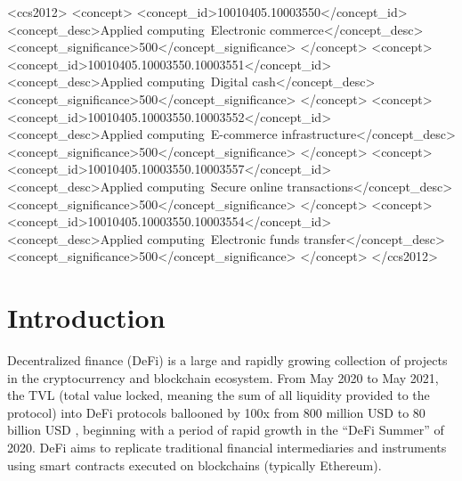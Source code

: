 \documentclass[sigconf, usenames, dvipsnames]{acmart}
\begin{document}
\begin{CCSXML}
<ccs2012>
   <concept>
       <concept_id>10010405.10003550</concept_id>
       <concept_desc>Applied computing~Electronic commerce</concept_desc>
       <concept_significance>500</concept_significance>
       </concept>
   <concept>
       <concept_id>10010405.10003550.10003551</concept_id>
       <concept_desc>Applied computing~Digital cash</concept_desc>
       <concept_significance>500</concept_significance>
       </concept>
   <concept>
       <concept_id>10010405.10003550.10003552</concept_id>
       <concept_desc>Applied computing~E-commerce infrastructure</concept_desc>
       <concept_significance>500</concept_significance>
       </concept>
   <concept>
       <concept_id>10010405.10003550.10003557</concept_id>
       <concept_desc>Applied computing~Secure online transactions</concept_desc>
       <concept_significance>500</concept_significance>
       </concept>
   <concept>
       <concept_id>10010405.10003550.10003554</concept_id>
       <concept_desc>Applied computing~Electronic funds transfer</concept_desc>
       <concept_significance>500</concept_significance>
       </concept>
 </ccs2012>
\end{CCSXML}



\maketitle

\section{Introduction}\label{sec:intro}
Decentralized finance (DeFi) is a large and rapidly growing collection of projects in the cryptocurrency and blockchain ecosystem. From May 2020 to May 2021, the TVL (total value locked, meaning the sum of all liquidity provided to the protocol) into DeFi protocols ballooned by 100x from 800 million USD to 80 billion USD \cite{defipulse}, beginning with a period of rapid growth in the ``DeFi Summer'' of 2020. DeFi aims to replicate traditional financial intermediaries and instruments using smart contracts executed on blockchains (typically Ethereum). 
\end{document}
